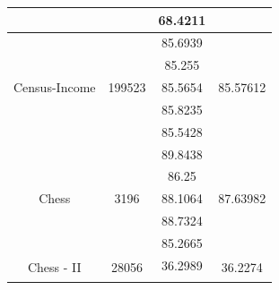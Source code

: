 \documentclass[12pt]{article}
\begin{document}
\begin{table}[H]
\begin{tabular}{|c|c|c|c|}
		&                         & 68.4211                                                                                          &                             \\ \hline
		\multirow{5}{*}{Census-Income}       & \multirow{5}{*}{199523} & 85.6939                                                                                          & \multirow{5}{*}{85.57612}   \\ \cline{3-3}
		&                         & 85.255                                                                                           &                             \\ \cline{3-3}
		&                         & 85.5654                                                                                          &                             \\ \cline{3-3}
		&                         & 85.8235                                                                                          &                             \\ \cline{3-3}
		&                         & 85.5428                                                                                          &                             \\ \hline
		\multirow{5}{*}{Chess}               & \multirow{5}{*}{3196}   & 89.8438                                                                                          & \multirow{5}{*}{87.63982}   \\ \cline{3-3}
		&                         & 86.25                                                                                            &                             \\ \cline{3-3}
		&                         & 88.1064                                                                                          &                             \\ \cline{3-3}
		&                         & 88.7324                                                                                          &                             \\ \cline{3-3}
		&                         & 85.2665                                                                                          &                             \\ \hline
		\multirow{5}{*}{Chess - II}          & \multirow{5}{*}{28056}  & 36.2989                                                                                          & \multirow{5}{*}{36.2274}    \\ \cline{3-3}

\end{tabular}
\end{table}
\end{document}
